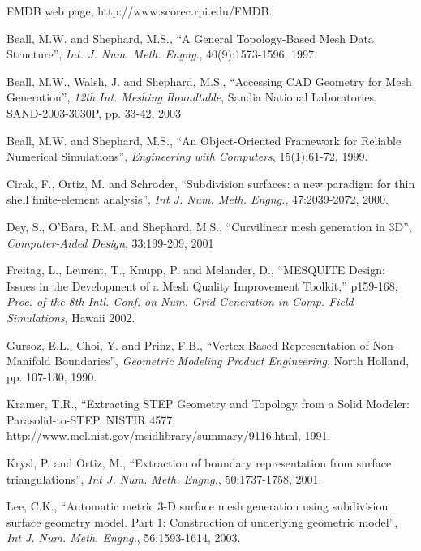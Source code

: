\documentclass{article}
\begin{document}
\begin{thebibliography}{99}

 FMDB web page, http://www.scorec.rpi.edu/FMDB.

 Beall, M.W. and Shephard, M.S., ``A General Topology-Based 
Mesh Data Structure'', \textit{Int. J. Num. Meth. Engng}., 
40(9):1573-1596, 1997.

 Beall, M.W., Walsh, J. and Shephard, M.S., ``Accessing 
CAD Geometry for Mesh Generation'', \textit{12th Int. Meshing 
Roundtable}, Sandia National Laboratories, SAND-2003-3030P, 
pp. 33-42, 2003

 Beall, M.W. and Shephard, M.S., ``An Object-Oriented Framework 
for Reliable Numerical Simulations'', \textit{Engineering with 
Computers}, 15(1):61-72, 1999.

 Cirak, F., Ortiz, M. and Schroder, ``Subdivision surfaces: 
a new paradigm for thin shell finite-element analysis'', \textit{Int 
J. Num. Meth. Engng.}, 47:2039-2072, 2000.

 Dey, S., O'Bara, R.M. and Shephard, M.S., ``Curvilinear 
mesh generation in 3D'', \textit{Computer-Aided Design}, 33:199-209, 
2001

 Freitag, L., Leurent, T., Knupp, P. and Melander, D., 
``MESQUITE Design: Issues in the Development of a Mesh Quality 
Improvement Toolkit,'' p159-168, \textit{Proc. of the 8th Intl. 
Conf. on Num. Grid Generation in Comp. Field Simulations}, 
Hawaii 2002.

 Gursoz, E.L., Choi, Y. and Prinz, F.B., ``Vertex-Based 
Representation of Non-Manifold Boundaries'', \textit{Geometric 
Modeling Product Engineering}, North Holland, pp. 107-130, 
1990.

 Kramer, T.R., ``Extracting STEP Geometry and Topology 
from a Solid Modeler: Parasolid-to-STEP, NISTIR 4577, \\
http://www.mel.nist.gov/msidlibrary/summary/9116.html, 
1991.

 Krysl, P. and Ortiz, M., ``Extraction of boundary representation 
from surface triangulations'', \textit{Int J. Num. Meth. Engng.}, 
50:1737-1758, 2001.

 Lee, C.K., ``Automatic metric 3-D surface mesh generation 
using subdivision surface geometry model. Part 1: Construction 
of underlying geometric model'', \textit{Int J. Num. Meth. Engng.}, 
56:1593-1614, 2003.


\end{thebibliography}
\end{document}
